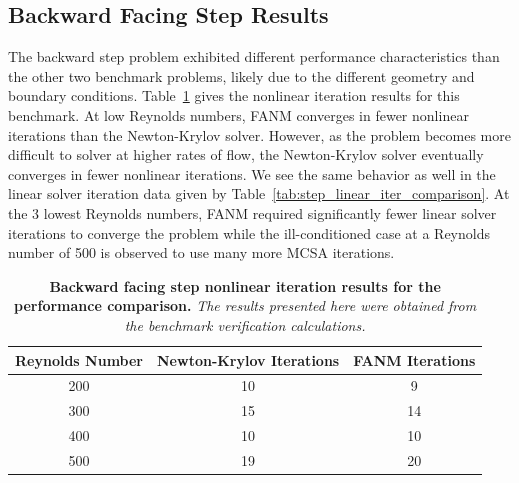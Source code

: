\clearpage

\subsection{Backward Facing Step Results}
\label{subsec:backward_step_comparison}

The backward step problem exhibited different performance
characteristics than the other two benchmark problems, likely due to
the different geometry and boundary
conditions. Table~\ref{tab:step_nonlinear_iter_comparison} gives the
nonlinear iteration results for this benchmark. At low Reynolds
numbers, FANM converges in fewer nonlinear iterations than the
Newton-Krylov solver. However, as the problem becomes more difficult
to solver at higher rates of flow, the Newton-Krylov solver eventually
converges in fewer nonlinear iterations. We see the same behavior as
well in the linear solver iteration data given by
Table~\ref{tab:step_linear_iter_comparison}. At the 3 lowest Reynolds
numbers, FANM required significantly fewer linear solver iterations to
converge the problem while the ill-conditioned case at a Reynolds
number of 500 is observed to use many more MCSA iterations. 

\begin{table}[h!]
  \begin{center}
    \begin{tabular}{ccc}\hline\hline
      \multicolumn{1}{c}{Reynolds Number}& 
      \multicolumn{1}{c}{Newton-Krylov Iterations}&
      \multicolumn{1}{c}{FANM Iterations}\\
      \hline
      200 & 10 & 9 \\
      300 & 15 & 14 \\
      400 & 10 & 10 \\
      500 & 19 & 20 \\
      \hline\hline
    \end{tabular}
  \end{center}
  \caption{\textbf{Backward facing step nonlinear iteration
      results for the performance comparison.} \textit{The results
      presented here were obtained from the benchmark verification
      calculations.}}
  \label{tab:step_nonlinear_iter_comparison}
\end{table}

